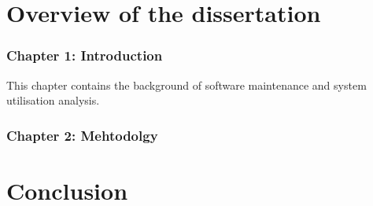 \section{Overview of the dissertation}
\subsubsection{Chapter 1: Introduction}
This chapter contains the background of software maintenance and system
utilisation analysis.
\subsubsection{Chapter 2: Mehtodolgy}

\section{Conclusion}

